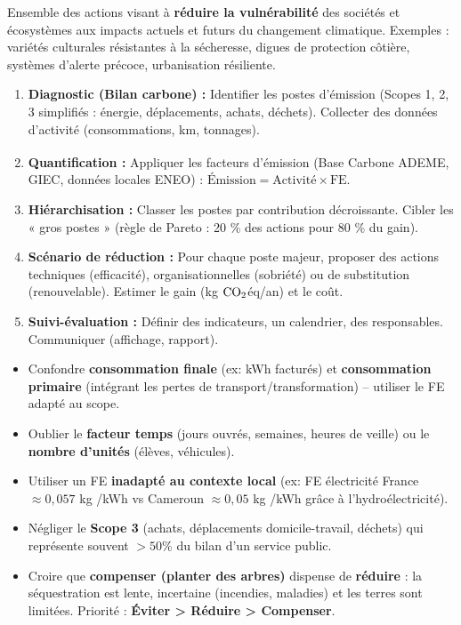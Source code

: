 \documentclass[11pt]{article}
\begin{document}
\begin{definition}[Adaptation]
Ensemble des actions visant à \textbf{réduire la vulnérabilité} des sociétés et écosystèmes aux impacts actuels et futurs du changement climatique. Exemples : variétés culturales résistantes à la sécheresse, digues de protection côtière, systèmes d'alerte précoce, urbanisation résiliente.
\end{definition}

\begin{methode}
\begin{enumerate}
\item \textbf{Diagnostic (Bilan carbone) :} Identifier les postes d'émission (Scopes 1, 2, 3 simplifiés : énergie, déplacements, achats, déchets). Collecter des données d'activité (consommations, km, tonnages).
\item \textbf{Quantification :} Appliquer les facteurs d'émission (Base Carbone\textsuperscript{\textregistered} ADEME, GIEC, données locales ENEO) : $\text{Émission} = \text{Activité} \times \text{FE}$.
\item \textbf{Hiérarchisation :} Classer les postes par contribution décroissante. Cibler les « gros postes » (règle de Pareto : 20 \% des actions pour 80 \% du gain).
\item \textbf{Scénario de réduction :} Pour chaque poste majeur, proposer des actions techniques (efficacité), organisationnelles (sobriété) ou de substitution (renouvelable). Estimer le gain (kg $\ce{CO2}$éq/an) et le coût.
\item \textbf{Suivi-évaluation :} Définir des indicateurs, un calendrier, des responsables. Communiquer (affichage, rapport).
\end{enumerate}
\end{methode}

\begin{attention}
\begin{itemize}
\item Confondre \textbf{consommation finale} (ex: kWh facturés) et \textbf{consommation primaire} (intégrant les pertes de transport/transformation) -- utiliser le FE adapté au scope.
\item Oublier le \textbf{facteur temps} (jours ouvrés, semaines, heures de veille) ou le \textbf{nombre d'unités} (élèves, véhicules).
\item Utiliser un FE \textbf{inadapté au contexte local} (ex: FE électricité France $\approx 0,057$ kg /kWh vs Cameroun $\approx 0,05$ kg /kWh grâce à l'hydroélectricité).
\item Négliger le \textbf{Scope 3} (achats, déplacements domicile-travail, déchets) qui représente souvent $> 50 \%$ du bilan d'un service public.
\item Croire que \textbf{compenser (planter des arbres)} dispense de \textbf{réduire} : la séquestration est lente, incertaine (incendies, maladies) et les terres sont limitées. Priorité : \textbf{Éviter > Réduire > Compenser}.
\end{itemize}
\end{attention}
\end{document}
